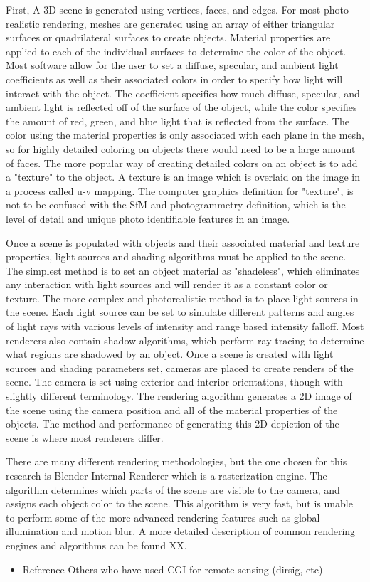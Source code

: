 First, A 3D scene is generated using vertices, faces, and edges.  For most photo-realistic rendering, meshes are generated using an array of either triangular surfaces or quadrilateral surfaces to create objects.  Material properties are applied to each of the individual surfaces to determine the color of the object.  Most software allow for the user to set a diffuse, specular, and ambient light coefficients as well as their associated colors in order to specify how light will interact with the object.  The coefficient specifies how much diffuse, specular, and ambient light is reflected off of the surface of the object, while the color specifies the amount of red, green, and blue light that is reflected from the surface.  The color using the material properties is only associated with each plane in the mesh, so for highly detailed coloring on objects there would need to be a large amount of faces.  The more popular way of creating detailed colors on an object is to add a "texture" to the object.  A texture is an image which is overlaid on the image in a process called u-v mapping.  The computer graphics definition for "texture", is not to be confused with the SfM and photogrammetry definition, which is the level of detail and unique photo identifiable features in an image.

Once a scene is populated with objects and their associated material and texture properties, light sources and shading algorithms must be applied to the scene.  The simplest method is to set an object material as "shadeless", which eliminates any interaction with light sources and will render it as a constant color or texture.  The more complex and photorealistic method is to place light sources in the scene.  Each light source can be set to simulate different patterns and angles of light rays with various levels of intensity and range based intensity falloff.  Most renderers also contain shadow algorithms, which perform ray tracing to determine what regions are shadowed by an object.  Once a scene is created with light sources and shading parameters set, cameras are placed to create renders of the scene.  The camera is set using exterior and interior orientations, though with slightly different terminology.  The rendering algorithm generates a 2D image of the scene using the camera position and all of the material properties of the objects.  The method and performance of generating this 2D depiction of the scene is where most renderers differ. 

There are many different rendering methodologies, but the one chosen for this research is Blender Internal Renderer which is a rasterization engine.  The algorithm determines which parts of the scene are visible to the camera, and assigns each object color to the scene.  This algorithm is very fast, but is unable to perform some of the more advanced rendering features such as global illumination and motion blur.  A more detailed description of common rendering engines and algorithms can be found XX.

\begin{itemize}
	\item Reference Others who have used CGI for remote sensing (dirsig, etc)
\end{itemize}